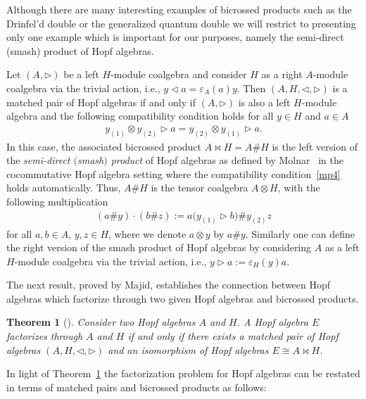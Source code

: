 \documentclass[10pt,a4paper]{amsart}
\numberwithin{equation}{section}
\newtheorem{Theorem}{Theorem}[section]
\begin{document}
Although there are many interesting examples of bicrossed products such as the Drinfel'd double \cite[Theorem~IX.3.5]{Kassel} or the generalized quantum double \cite[Example~7.2.6]{majid} we will restrict to presenting only one example which is important for our purposes, namely the semi-direct (smash) product of Hopf algebras.

\begin{Example} \label{exempleban}
Let $(A, \triangleright)$ be a left $H$-module coalgebra and consider $H$ as a right $A$-module coalgebra via the trivial action, i.e., $y \triangleleft a = \varepsilon_A(a) y$. Then $(A,H, \triangleleft, \triangleright)$ is a matched pair of Hopf algebras if and only if $(A, \triangleright)$ is also a left $H$-module algebra and the following compatibility condition holds for all $y \in H$ and $a\in A$
\begin{gather*}
y_{(1)} \otimes y_{(2)} \triangleright a = y_{(2)} \otimes y_{(1)} \triangleright a.
\end{gather*}
In this case, the associated bicrossed product $A\bowtie H = A\# H$ is the left version of the \emph{semi-direct $($smash$)$ product} of Hopf algebras as defined by Molnar~\cite{Mo} in the cocommutative Hopf algebra setting where the compatibility condition~\eqref{mp4} holds automatically. Thus, $A\# H$ is the tensor coalgebra $A\otimes H$, with the following multiplication
\begin{gather*}
(a \# y) \cdot (b \# z):= a \big(y_{(1)} \triangleright b \big) \# y_{(2)} z
\end{gather*}
for all $a, b\in A$, $y, z\in H$, where we denote $a\otimes y$ by $a\# y$. Similarly one can define the right version of the smash product of Hopf algebras by considering $A$ as a left $H$-module coalgebra via the trivial action, i.e., $y \triangleright a := \varepsilon_H(y) a$.
\end{Example}

The next result, proved by Majid, establishes the connection between Hopf algebras which factorize through two given Hopf algebras and bicrossed products.

\begin{Theorem}[{\cite[Theorem 7.2.3]{majid2}}]\label{carMaj}
Consider two Hopf algebras $A$ and $H$. A Hopf algebra $E$ factorizes through $A$ and $H$ if and only if there exists a matched pair of Hopf algebras $(A, H, \triangleleft, \triangleright)$ and an isomorphism of Hopf algebras $E \cong A \bowtie H$.
\end{Theorem}
In light of Theorem~\ref{carMaj} the factorization problem for Hopf
algebras can be restated in terms of matched pairs and bicrossed products as follows:
\end{document}

